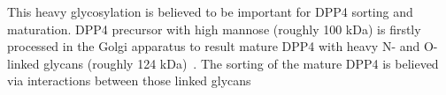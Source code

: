 This heavy glycosylation is believed to be important for DPP4 sorting and maturation. DPP4 precursor with high mannose (roughly 100 kDa) is firstly processed in the Golgi apparatus to result mature DPP4 with heavy N- and O-linked glycans (roughly 124 kDa)~\cite{Matter_1991}. The sorting of the mature DPP4 is believed via interactions between those linked glycans 